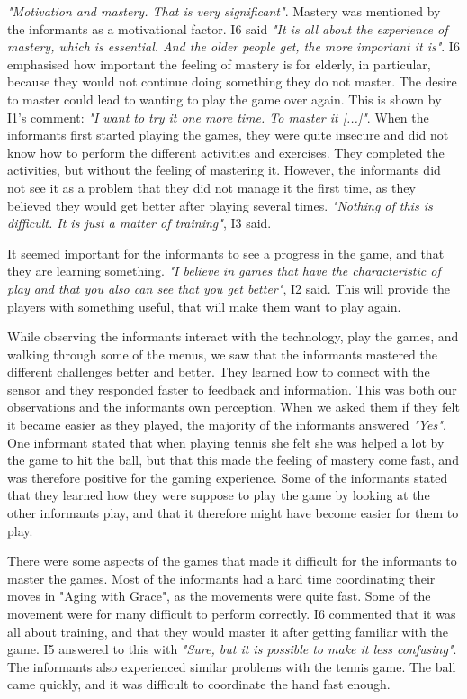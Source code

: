 \emph{"Motivation and mastery. That is very significant"}. Mastery was mentioned by the informants as a motivational factor. I6 said \emph{"It is all about the experience of mastery, which is essential. And the older people get, the more important it is"}. I6 emphasised how important the feeling of mastery is for elderly, in particular, because they would not continue doing something they do not master. The desire to master could lead to wanting to play the game over again. This is shown by I1's comment: \emph{"I want to try it one more time. To master it [...]"}. When the informants first started playing the games, they were quite insecure and did not know how to perform the different activities and exercises. They completed the activities, but without the feeling of mastering it. However, the informants did not see it as a problem that they did not manage it the first time, as they believed they would get better after playing several times. \emph{"Nothing of this is difficult. It is just a matter of training"}, I3 said. 

It seemed important for the informants to see a progress in the game, and that they are learning something. \emph{"I believe in games that have the characteristic of play and that you also can see that you get better"}, I2 said. This will provide the players with something useful, that will make them want to play again.

While observing the informants interact with the technology, play the games, and walking through some of the menus, we saw that the informants mastered the different challenges better and better. They learned how to connect with the sensor and they responded faster to feedback and information. This was both our observations and the informants own perception. When we asked them if they felt it became easier as they played, the majority of the informants answered \emph{"Yes"}. One informant stated that when playing tennis she felt she was helped a lot by the game to hit the ball, but that this made the feeling of mastery come fast, and was therefore positive for the gaming experience. Some of the informants stated that they learned how they were suppose to play the game by looking at the other informants play, and that it therefore might have become easier for them to play. 

There were some aspects of the games that made it difficult for the informants to master the games. Most of the informants had a hard time coordinating their moves in "Aging with Grace", as the movements were quite fast. Some of the movement were for many difficult to perform correctly. I6 commented that it was all about training, and that they would master it after getting familiar with the game. I5 answered to this with \emph{"Sure, but it is possible to make it less confusing"}. The informants also experienced similar problems with the tennis game. The ball came quickly, and it was difficult to coordinate the hand fast enough. 

